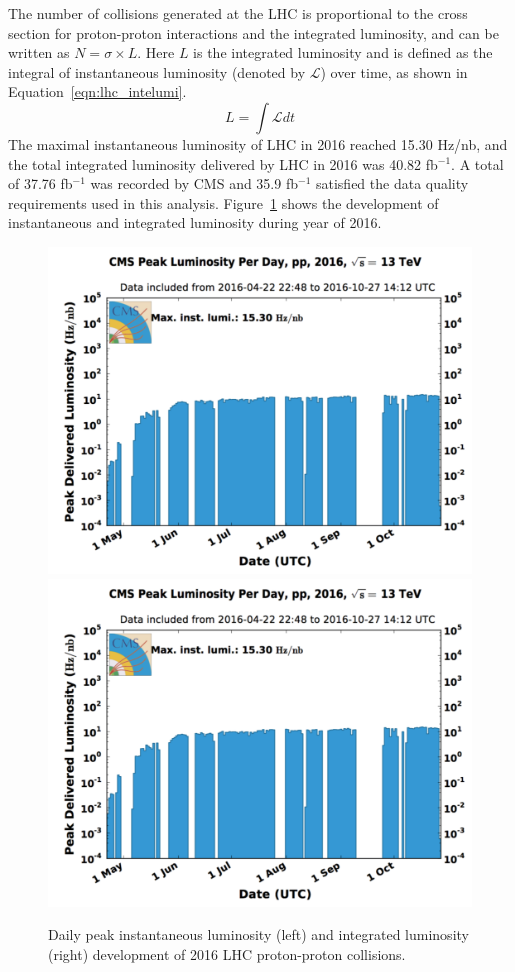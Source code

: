 \vspace{0.3cm}
The number of collisions generated at the LHC is proportional to the cross section for proton-proton interactions and the integrated luminosity, and can be written as $N=\sigma \times L$. Here $L$ is the integrated luminosity and is defined as the integral of instantaneous luminosity (denoted by $\mathcal{L}$) over time, as shown in Equation~\ref{eqn:lhc_intelumi}.
\begin{equation}
L=\int \mathcal{L}dt
\label{eqn:lhc_intelumi}
\end{equation}
The maximal instantaneous luminosity of LHC in 2016 reached 15.30 Hz/nb, and the total integrated luminosity delivered by LHC in 2016 was 40.82 fb$^{-1}$. A total of 37.76 fb$^{-1}$ was recorded by CMS and 35.9 fb$^{-1}$ satisfied the data quality requirements used in this analysis. Figure~\ref{fig:lhc_lumi2016} shows the development of instantaneous and integrated luminosity during year of 2016.

\begin{figure}[htbp]
\begin{center}
\includegraphics[width=0.49\linewidth, page=1]{figures/lhc_lumi2016.pdf}
\includegraphics[width=0.49\linewidth, page=2]{figures/lhc_lumi2016.pdf}
\caption{Daily peak instantaneous luminosity (left) and integrated luminosity (right) development of 2016 LHC proton-proton collisions.}
\label{fig:lhc_lumi2016}
\end{center}
\end{figure}

